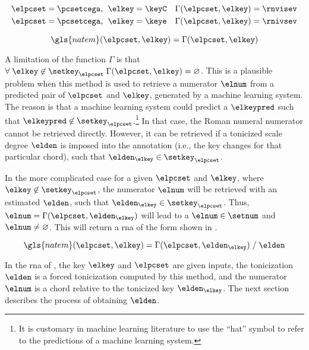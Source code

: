 \begin{equation}
    \label{eq:numerator_from_pcset_key}
    \begin{split}
        \elpcset = \pcsetcega \text{, } \; \elkey = \keyC \quad \Gamma(\elpcset, \elkey) = \rnvisev \\
        \elpcset = \pcsetcega \text{, } \; \elkey = \keye \quad \Gamma(\elpcset, \elkey) = \rnivsev \\
    \end{split}
\end{equation}

\begin{equation}
    \label{eq:natem_simple}
        \gls{natem}(\elpcset, \elkey) = \Gamma(\elpcset, \elkey)  
\end{equation}


A limitation of the function $\Gamma$ is that $\forall \;
\elkey \not\in \setkey_\elpcset \; \Gamma(\elpcset, \elkey)
= \varnothing$. This is a plausible problem when this method
is used to retrieve a numerator $\elnum$ from a predicted
pair of $\elpcset$ and $\elkey$, generated by a machine
learning system. The reason is that a machine learning
system could predict a $\elkeypred$ such that $\elkeypred
\not\in \setkey_\elpcset$.\footnote{It is customary in
machine learning literature to use the ``hat'' symbol to
refer to the predictions of a machine learning system.} In
that case, the Roman numeral numerator cannot be retrieved
directly. However, it can be retrieved if a tonicized scale
degree $\elden$ is imposed into the annotation (i.e., the
key changes for that particular chord), such that
$\elden_{\elkey} \in \setkey_\elpcset$.

In the more complicated case for a given $\elpcset$ and
$\elkey$, where $\elkey \not\in \setkey_\elpcset$, the
numerator $\elnum$ will be retrieved with an estimated
$\elden$, such that $\elden_{\elkey} \in \setkey_\elpcset$.
Thus, $\elnum = \Gamma(\elpcset, \elden_{\elkey})$ will lead
to a $\elnum \in \setnum$ and $\elnum \neq \varnothing$.
This will return a \gls{rna} of the form shown in
.

\begin{equation}
    \label{eq:numerator_from_pcset_den}
    \gls{natem}(\elpcset, \elkey) = \Gamma(\elpcset, \elden_{\elkey}) \; \text{/} \; \elden
\end{equation}

In the \gls{rna} of , the
key $\elkey$ and $\elpcset$ are given inputs, the
tonicization $\elden$ is a forced tonicization computed by
this method, and the numerator $\elnum$ is a chord relative
to the tonicized key $\elden_{\elkey}$. The next section
describes the process of obtaining $\elden$.
